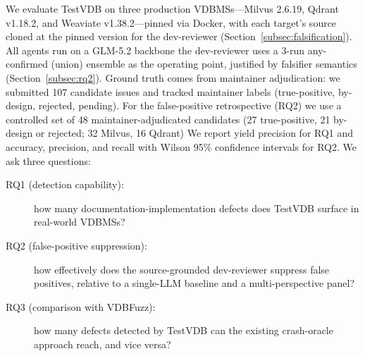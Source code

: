 \documentclass[sigconf]{acmart}
\begin{document}
We evaluate TestVDB on three production VDBMSs---Milvus 2.6.19, Qdrant v1.18.2, and Weaviate v1.38.2---pinned via Docker, with each target's source cloned at the pinned version for the dev-reviewer (Section~\ref{subsec:falsification}). All agents run on a GLM-5.2 backbone  the dev-reviewer uses a 3-run any-confirmed (union) ensemble as the operating point, justified by falsifier semantics (Section~\ref{subsec:rq2}). Ground truth comes from maintainer adjudication: we submitted 107 candidate issues and tracked maintainer labels (true-positive, by-design, rejected, pending). For the false-positive retrospective (RQ2) we use a controlled set of 48 maintainer-adjudicated candidates (27 true-positive, 21 by-design or rejected; 32 Milvus, 16 Qdrant) We report yield precision for RQ1 and accuracy, precision, and recall with Wilson 95\% confidence intervals for RQ2. We ask three questions:
\begin{description}
  \item[RQ1 (detection capability):] how many documentation-implementation defects does TestVDB surface in real-world VDBMSs?
  \item[RQ2 (false-positive suppression):] how effectively does the source-grounded dev-reviewer suppress false positives, relative to a single-LLM baseline and a multi-perspective panel?
  \item[RQ3 (comparison with VDBFuzz):] how many defects detected by TestVDB can the existing crash-oracle approach reach, and vice versa?
\end{description}
\end{document}
